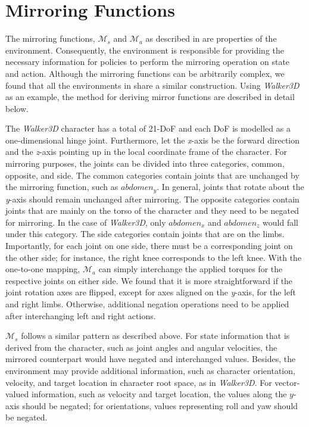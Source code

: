 \section{Mirroring Functions}
\label{sec:mirroring-functions}

The mirroring functions, $\mathcal{M}_s$ and $\mathcal{M}_a$ as described in  are properties of the environment.  Consequently, the environment is responsible for providing the necessary information for policies to perform the mirroring operation on state and action.  Although the mirroring functions can be arbitrarily complex, we found that all the environments in  share a similar construction.  Using \textit{Walker3D} as an example, the method for deriving mirror functions are described in detail below.

The \textit{Walker3D} character has a total of 21-DoF and each DoF is modelled as a one-dimensional hinge joint.  Furthermore, let the \textit{x}-axis be the forward direction and the \textit{z}-axis pointing up in the local coordinate frame of the character.  For mirroring purposes, the joints can be divided into three categories, common, opposite, and side.  The common categories contain joints that are unchanged by the mirroring function, such as $abdomen_y$.  In general, joints that rotate about the \textit{y}-axis should remain unchanged after mirroring.  The opposite categories contain joints that are mainly on the torso of the character and they need to be negated for mirroring.  In the case of \textit{Walker3D}, only $abdomen_x$ and $abdomen_z$ would fall under this category.  The side categories contain joints that are on the limbs.  Importantly, for each joint on one side, there must be a corresponding joint on the other side; for instance, the right knee corresponds to the left knee.  With the one-to-one mapping, $\mathcal{M}_a$ can simply interchange the applied torques for the respective joints on either side.  We found that it is more straightforward if the joint rotation axes are flipped, except for axes aligned on the  \textit{y}-axis, for the left and right limbs.  Otherwise, additional negation operations need to be applied after interchanging left and right actions. 

$\mathcal{M}_s$ follows a similar pattern as described above.  For state information that is derived from the character, such as joint angles and angular velocities, the mirrored counterpart would have negated and interchanged values.  Besides, the environment may provide additional information, such as character orientation, velocity, and target location in character root space, as in \textit{Walker3D}.  For vector-valued information, such as velocity and target location, the values along the $y$-axis should be negated; for orientations, values representing roll and yaw should be negated.


